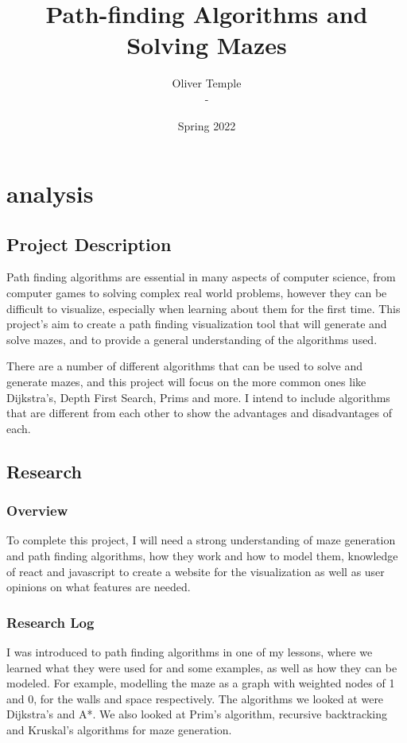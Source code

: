 \documentclass[titlepage]{article}
\title{Path-finding Algorithms and Solving Mazes}
\author{Oliver Temple \\ -}
\date{Spring 2022}
\begin{document}
\maketitle
\tableofcontents

\section{analysis}
\subsection{Project Description}
Path finding algorithms are essential in many aspects of computer science, from computer games to solving complex real world problems, however they can be difficult to visualize, especially when learning about them for the first time. This project's aim to create a path finding visualization tool that will generate and solve mazes, and to provide a general understanding of the algorithms used. 

There are a number of different algorithms that can be used to solve and generate mazes, and this project will focus on the more common ones like Dijkstra's, Depth First Search, Prims and more. I intend to include algorithms that are different from each other to show the advantages and disadvantages of each.

\subsection{Research}
\subsubsection{Overview}
To complete this project, I will need a strong understanding of maze generation and path finding algorithms, how they work and how to model them, knowledge of react and javascript to create a website for the visualization as well as user opinions on what features are needed.
\subsubsection{Research Log}
I was introduced to path finding algorithms in one of my lessons, where we learned what they were used for and some examples, as well as how they can be modeled. For example, modelling the maze as a graph with weighted nodes of 1 and 0, for the walls and space respectively. The algorithms we looked at were Dijkstra's and A*. We also looked at Prim's algorithm, recursive backtracking and Kruskal's algorithms for maze generation.
\end{document}
